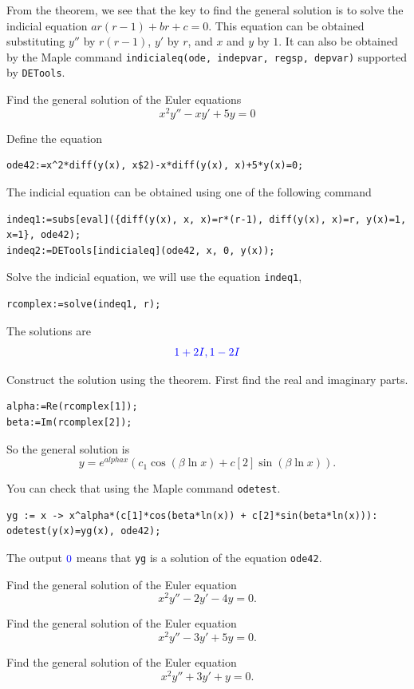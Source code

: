 \documentclass[
  12pt]{elegantbook}
\begin{document}
From the theorem, we see that the key to find the general solution is to solve the indicial equation \(ar(r-1)+br+c=0\). This equation can be obtained substituting \(y''\) by \(r(r-1)\), \(y'\) by \(r\), and \(x\) and \(y\) by \(1\). It can also be obtained by the Maple command \texttt{indicialeq(ode,\ indepvar,\ regsp,\ depvar)} supported by \texttt{DETools}.

\begin{example}
Find the general solution of the Euler equations
\[x^2y''-xy'+5y=0\]
\end{example}

\begin{solution}
Define the equation

\begin{verbatim}
ode42:=x^2*diff(y(x), x$2)-x*diff(y(x), x)+5*y(x)=0;
\end{verbatim}

The indicial equation can be obtained using one of the following command

\begin{verbatim}
indeq1:=subs[eval]({diff(y(x), x, x)=r*(r-1), diff(y(x), x)=r, y(x)=1, x=1}, ode42);
indeq2:=DETools[indicialeq](ode42, x, 0, y(x));
\end{verbatim}

Solve the indicial equation, we will use the equation \texttt{indeq1},

\begin{verbatim}
rcomplex:=solve(indeq1, r);
\end{verbatim}

The solutions are
\[{\color{blue}1+2I, 1-2I}\]

Construct the solution using the theorem.
First find the real and imaginary parts.

\begin{verbatim}
alpha:=Re(rcomplex[1]);
beta:=Im(rcomplex[2]);
\end{verbatim}

So the general solution is
\[y=e^{alpha x}(c_1\cos(\beta\ln x)+c[2]\sin(\beta\ln x)).\]

You can check that using the Maple command \texttt{odetest}.

\begin{verbatim}
yg := x -> x^alpha*(c[1]*cos(beta*ln(x)) + c[2]*sin(beta*ln(x))):
odetest(y(x)=yg(x), ode42);
\end{verbatim}

The output \({\color{blue}0}\) means that \texttt{yg} is a solution of the equation \texttt{ode42}.
\end{solution}

\begin{exercise}
Find the general solution of the Euler equation
\[x^2y''-2y'-4y=0.\]
\end{exercise}

\begin{exercise}
Find the general solution of the Euler equation
\[x^2y''-3y'+5y=0.\]
\end{exercise}

\begin{exercise}
Find the general solution of the Euler equation
\[x^2y''+3y'+y=0.\]
\end{exercise}
\end{document}
